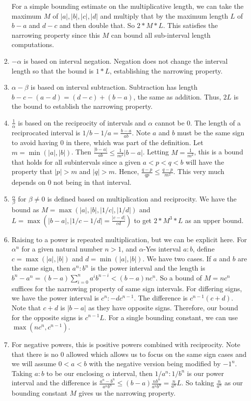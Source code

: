 \documentclass[12pt]{article}
\theoremstyle{remark}
\begin{document}
\begin{enumerate}
    For a simple bounding estimate on the multiplicative length, we can take the maximum $M$ of $|a|, |b|, |c|, |d|$ and multiply that by the maximum length $L$ of $b-a$ and $d-c$ and then double that. So $2*M*L$. This satisfies the narrowing property since this $M$ can bound all sub-interval length computations.
    \item $-\alpha$ is based on interval negation. Negation does not change the interval length so that the bound is $1*L$, establishing the narrowing property. 
    \item $\alpha - \beta$ is based on interval subtraction. Subtraction has length $b-c - (a-d) = (d-c) + (b-a)$, the same as addition. Thus, $2L$ is the bound to establish the narrowing property. 
    \item $\frac{1}{\alpha}$ is based on the reciprocity of intervals and $\alpha$ cannot be $0$. The length of a reciprocated interval is $1/b - 1/a = \tfrac{b-a}{ab}$. Note $a$ and $b$ must be the same sign to avoid having 0 in there, which was part of the definition. Let $m = \min(|a|, |b|)$. Then $\tfrac{|b-a|}{ab} \leq \tfrac{1}{m^2} |b-a|$. Letting $M = \tfrac{1}{m^2}$, this is a bound that holds for all subintervals since a given $a < p < q < b$ will have the property that $|p| > m$ and $|q| > m$. Hence, $\frac{q-p}{qp} \leq \frac{q-p}{m^2}$. This very much depends on $0$ not being in that interval. 
    \item $\tfrac{\alpha}{\beta}$ for $\beta \neq 0$ is defined based on multiplication and reciprocity. We have the bound as $M = \max(|a|, |b|, |1/c|, |1/d|)$ and $L= \max(|b-a|, |1/c - 1/d|= \tfrac{|c-d|}{cd} )$ to get $2*M^3*L$ as an upper bound. 
    \item Raising to a power is repeated multiplication, but we can be explicit here. For $\alpha^n$ for a given natural number $n>1$, and $\alpha$-Yes interval $a:b$, define $c = \max(|a|, |b|)$ and $d=\min(|a|,|b|)$.  We have two cases. If $a$ and $b$ are the same sign, then $a^n:b^n$ is the power interval and the length is $b^n - a^n = (b-a)\sum_{i=0}^n a^i b^{n-i} < (b-a)nc^n$. So a bound of $M= nc^{n}$ suffices for the narrowing property of same sign intervals. For differing signs, we have the power interval is $c^n:-dc^{n-1}$. The difference is $c^{n-1} (c+d)$. Note that $c+d$ is $|b-a|$ as they have opposite signs. Therefore, our bound for the opposite signs is $c^{n-1} L$. For a single bounding constant, we can use $\max(n c^{n}, c^{n-1})$.
    \item For negative powers, this is positive powers combined with reciprocity. Note that there is no 0 allowed which allows us to focus on the same sign cases and we will assume $0 < a < b$ with the negative version being modified by $-1^n$. Taking $a:b$ to be our enclosing $\alpha$ interval, then $1/a^n : 1/b^n$ is our power interval and the difference is $\frac{a^n-b^n}{a^n b^n} \leq (b-a) \frac{n b^n}{a^n b^n} = \frac{n}{a^n} L$. So taking $\frac{n}{a^n}$ as our bounding constant $M$ gives us the narrowing property. 
\end{enumerate}
\end{document}

